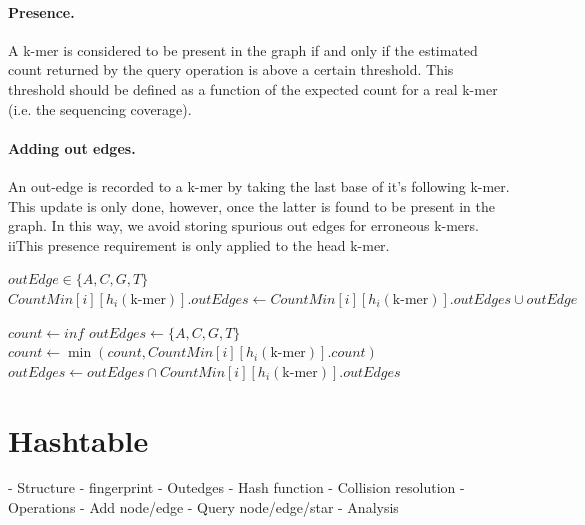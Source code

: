 \paragraph{Presence.} A k-mer is considered to be present in the graph if and only if the estimated count returned by the query operation
is above a certain threshold. This threshold should be defined as a function of the expected count for a real k-mer (i.e. the sequencing coverage).

\paragraph{Adding out edges.} An out-edge is recorded to a k-mer by taking the last base of it's following k-mer. This update is only done,
however, once the latter is found to be present in the graph. In this way, we avoid storing spurious out edges for erroneous k-mers.
iiThis presence requirement is only applied to the head k-mer.

\begin{algorithm}[htbp]
    \caption{$\mathit{addOutEdge}(\text{k-mer}, \mathit{outEdge})$}\label{alg:addOutEdge}
    \begin{algorithmic}
        \Ensure $\mathit{outEdge} \in \{A, C, G, T\}$
            \State $\mathit{CountMin}[i][h_i(\text{k-mer})].\mathit{outEdges} \gets \mathit{CountMin}[i][h_i(\text{k-mer})].\mathit{outEdges} \cup \mathit{outEdge}$
        \EndFor
    \end{algorithmic}
\end{algorithm}

\begin{algorithm}
    \caption{$\mathit{query}(\text{k-mer})$}\label{alg:query}
    \begin{algorithmic}
        \State $\mathit{count} \gets \mathit{inf}$
        \State $\mathit{outEdges} \gets \{A, C, G, T\}$
            \State $\mathit{count} \gets \min(\mathit{count}, \mathit{CountMin}[i][h_i(\text{k-mer})].\mathit{count})$
            \State $\mathit{outEdges} \gets \mathit{outEdges} \cap \mathit{CountMin}[i][h_i(\text{k-mer})].\mathit{outEdges}$
        \EndFor
    \end{algorithmic}
\end{algorithm}


\section{Hashtable}
- Structure
  - fingerprint
  - Outedges
- Hash function 
- Collision resolution
- Operations 
  - Add node/edge
  - Query node/edge/star 
- Analysis 





